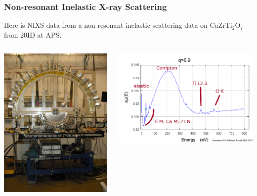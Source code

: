 \documentclass[10pt, xcolor=x11names, compress]{beamer}
\begin{document}
\begin{frame}
  \frametitle{Non-resonant Inelastic X-ray Scattering}

  \small
  Here is NIXS data from a non-resonant inelastic scattering data on
  CaZrTi$_2$O$_7$ from 20ID at APS.
  \begin{columns}[T]
    \begin{column}{0.42\linewidth}
      \includegraphics[width=\linewidth]{images/lerix_sm.jpg}
    \end{column}
    \begin{column}{0.6\linewidth}
      \includegraphics[width=0.7\linewidth]{images/nixs.png}


\end{column}
\end{columns}
\end{frame}
\end{document}
